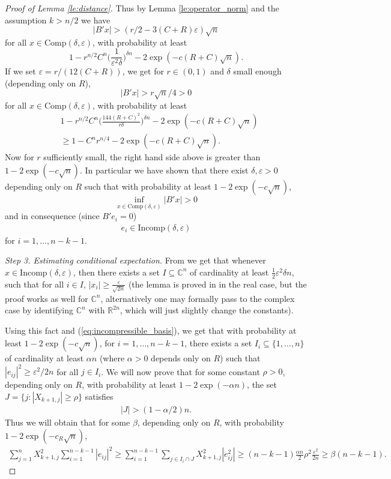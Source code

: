 \documentclass[12pt,reqno]{amsart}
\begin{document}
\begin{proof}[Proof of Lemma \ref{le:distance}]
Thus by Lemma \ref{le:operator_norm} and the assumption $k > n/2$ we have
\[
  |B'x| > (r/2 - 3(C+R)\varepsilon)\sqrt{n}
\]
for all $x \in {\mathrm{Comp}}(\delta,\varepsilon)$, with probability at least
\[
  1 - r^{n/2}C^n\Big(\frac{1}{\varepsilon^2 \delta}\Big)^{\delta n} - 2\exp(-c(R+C)\sqrt{n}).
\]
If we set $\varepsilon = r/(12(C+R))$, we get for $r \in (0,1)$ and $\delta$ small enough (depending only on $R$),
\[
|B'x| > r\sqrt{n}/4 > 0
\]
for all $x \in {\mathrm{Comp}}(\delta,\varepsilon)$,
with probability at least
\begin{align*}
&1 - r^{n/2}C^n\Big(\frac{144(R+C)^2}{r \delta}\Big)^{\delta n} - 2\exp(-c(R+C)\sqrt{n})\\
&\ge 1 - C^n r^{n/4} - 2 \exp(-c(R+C)\sqrt{n}).
\end{align*}
Now for $r$ sufficiently small, the right hand side above is greater than $1 -  2\exp(-c\sqrt{n})$.
In particular we have shown that there exist $\delta,\varepsilon > 0$ depending only on $R$ such that with probability at least $1 - 2\exp(-c\sqrt{n})$,
\[
\inf_{x\in {\mathrm{Comp}}(\delta,\varepsilon)}|B'x| > 0
\]
and in consequence (since $B' e_i = 0$)
\begin{align}\label{eq:incompressible_basis}
e_i \in {\mathrm{Incomp}}(\delta,\varepsilon)
\end{align}
for $i = 1,\ldots,n-k-1$.

\medskip
\noindent\textit{Step 3. Estimating conditional expectation.}
From \cite[Lemma 3.4]{RV} we get that whenever $x \in
{\mathrm{Incomp}}(\delta,\varepsilon)$, then there exists a set $I \subseteq {\mathbb{C}}^n$ of
cardinality at least $\frac{1}{2}\varepsilon^2\delta n$, such that for all $i
\in I$, $|x_i| \ge \frac{\varepsilon}{\sqrt{2n}}$ (the lemma is proved in
\cite{RV} in the real case, but the proof works as well for ${\mathbb{C}}^n$,
alternatively one may formally pass to the complex case by identifying ${\mathbb{C}}^n$
with ${\mathbb{R}}^{2n}$, which will just slightly change the constants).

Using this fact and (\ref{eq:incompressible_basis}), we get that with
probability at least $1 - 2\exp(-c\sqrt{n})$, for $i=1,\ldots,n-k-1$, there
exists a set $I_i \subseteq \{1,\ldots,n\}$ of cardinality at least $\alpha n$
(where $\alpha > 0$ depends only on $R$) such that $|e_{ij}|^2 \ge
\varepsilon^2/2n$ for all $j \in I_i$. We will now prove that for some
constant $\rho > 0$, depending only on $R$, with probability at least $1 -
2\exp(- \alpha n)$, the set $J = \{j\colon |X_{k+1,j}| \ge \rho\}$ satisfies
\begin{align}\label{eq:cardinality_est}
|J| > (1-\alpha/2)n.
\end{align}
Thus we will obtain that for some $\beta$, depending only on $R$, with
probability $1 - 2\exp(- c_R \sqrt{n})$,
\begin{align}\label{eq:cond_exp_est}
  \sum_{j=1}^nX_{k+1,j}^2\sum_{i=1}^{n-k-1}|e_{ij}|^2   \ge \sum_{i=1}^{n-k-1} \sum_{j\in I_i\cap J} X_{k+1,j}^2|e_{ij}^2|   \ge (n-k-1)\frac{\alpha n}{2} \rho^2 \frac{\varepsilon^2}{2n}   \ge \beta(n-k-1).
\end{align}


\end{proof}
\end{document}
